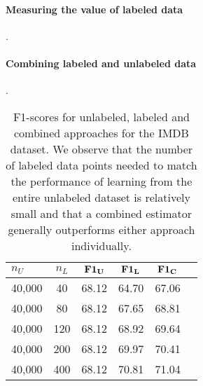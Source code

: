 \paragraph{Measuring the value of labeled data}
.


\paragraph{Combining labeled and unlabeled data}
.



\begin{table}[t]
\caption{F1-scores for unlabeled, labeled and combined approaches for the IMDB dataset. We observe that the number of labeled data points needed to match the performance of learning from the entire unlabeled dataset is relatively small and that a combined estimator generally outperforms either approach individually. }
\label{sample-table}
\vskip 0.15in
\renewcommand{\arraystretch}{1.25} %
\begin{center}
\begin{small}
\begin{tabular}{lccccr}
\hline
$n_U$ & $n_L$ & $\bf{F1}_U$ & $\bf{F1}_L$ &  $\bf{F1}_C$ \\
\hline
40,000 & 40 & 68.12 & 64.70 & 67.06 \\
40,000 & 80 & 68.12 & 67.65 & 68.81 \\
40,000 & 120 & 68.12 & 68.92 & 69.64 \\
40,000 & 200 & 68.12 & 69.97 & 70.41 \\
40,000 & 400 & 68.12 & 70.81 & 71.04 \\
\hline
\end{tabular}
\end{small}
\end{center}
\vskip -0.1in
\end{table}

